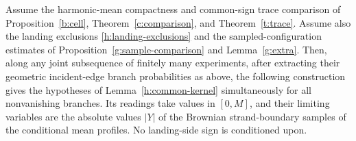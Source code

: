 \begin{proposition}
\label{h:readings}
Assume the harmonic-mean compactness and common-sign trace comparison of
Proposition~\ref{b:cell}, Theorem~\ref{c:comparison}, and
Theorem~\ref{t:trace}. Assume also the landing exclusions
\eqref{h:landing-exclusions} and the sampled-configuration estimates
of Proposition~\ref{g:sample-comparison} and Lemma~\ref{g:extra}.
Then, along any joint subsequence of finitely many experiments, after
extracting their geometric incident-edge branch probabilities as above,
the following construction gives the hypotheses of
Lemma~\ref{h:common-kernel} simultaneously for all nonvanishing branches.
Its readings take values in $[0,M]$, and their limiting variables are
the absolute values $|Y|$ of the Brownian strand-boundary samples of the
conditional mean profiles. No landing-side sign is conditioned upon.
\end{proposition}
